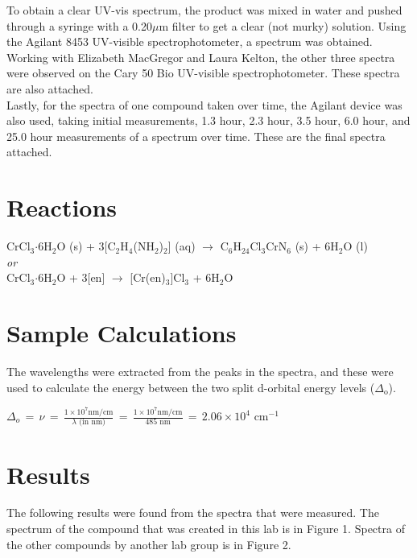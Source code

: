 \documentclass[11pt]{article}
\newcommand{\sub}[1]{\ensuremath{_{\textrm{#1}}}}
\begin{document}
To obtain a clear UV-vis spectrum, the product was mixed in water and pushed through a syringe with a 0.20$\mu$m filter to get a clear (not murky) solution. Using the Agilant 8453 UV-visible spectrophotometer, a spectrum was obtained. \\

Working with Elizabeth MacGregor and Laura Kelton, the other three spectra were observed on the Cary 50 Bio UV-visible spectrophotometer. These spectra are also attached. \\

Lastly, for the spectra of one compound taken over time, the Agilant device was also used, taking initial measurements, 1.3 hour, 2.3 hour, 3.5 hour, 6.0 hour, and 25.0 hour measurements of a spectrum over time. These are the final spectra attached.


\section{Reactions}
\begin{center}
CrCl\sub{3}$\cdot$6H\sub{2}O (s) + 3[C\sub{2}H\sub{4}(NH\sub{2})\sub{2}] (aq) $\rightarrow$ C\sub{6}H\sub{24}Cl\sub{3}CrN\sub{6} (s) + 6H\sub{2}O (l)\\
\textit{or} \\
CrCl\sub{3}$\cdot$6H\sub{2}O + 3[en] $\rightarrow$ [Cr(en)\sub{3}]Cl\sub{3} + 6H\sub{2}O
\end{center}


\section{Sample Calculations}
The wavelengths were extracted from the peaks in the spectra, and these were used to calculate the energy between the two split d-orbital energy levels ($\Delta$\sub{o}). \\

\begin{center}
  $\Delta_{o} \, = \, \nu \, = \, \frac{1 \times 10^{7} \textrm{nm/cm}}{\lambda \textrm{ (in nm)}} \, = \, \frac{1 \times 10^{7} \textrm{nm/cm}}{485 \textrm{ nm}} \, = \, 2.06 \times 10^{4} \textrm{ cm}^{-1}$
\end{center}


\section{Results}
The following results were found from the spectra that were measured. The spectrum of the compound that was created in this lab is in Figure 1. Spectra of the other compounds by another lab group is in Figure 2.
\end{document}
